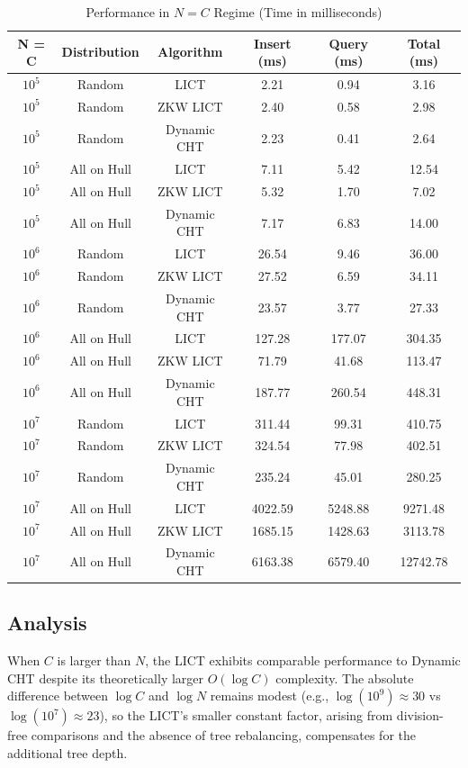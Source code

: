 \documentclass[11pt,a4paper]{article}
\theoremstyle{definition}
\theoremstyle{plain}
\begin{document}
\begin{table}[h]
\centering
\caption{Performance in $N = C$ Regime (Time in milliseconds)}
\label{tab:nc-regime}
\begin{tabular}{@{}cccccc@{}}
\toprule
\textbf{N = C} & \textbf{Distribution} & \textbf{Algorithm} & \textbf{Insert (ms)} & \textbf{Query (ms)} & \textbf{Total (ms)} \\
\midrule
$10^5$ & Random & LICT & 2.21 & 0.94 & 3.16 \\
$10^5$ & Random & ZKW LICT & 2.40 & 0.58 & 2.98 \\
$10^5$ & Random & Dynamic CHT & 2.23 & 0.41 & 2.64 \\
$10^5$ & All on Hull & LICT & 7.11 & 5.42 & 12.54 \\
$10^5$ & All on Hull & ZKW LICT & 5.32 & 1.70 & 7.02 \\
$10^5$ & All on Hull & Dynamic CHT & 7.17 & 6.83 & 14.00 \\
\midrule
$10^6$ & Random & LICT & 26.54 & 9.46 & 36.00 \\
$10^6$ & Random & ZKW LICT & 27.52 & 6.59 & 34.11 \\
$10^6$ & Random & Dynamic CHT & 23.57 & 3.77 & 27.33 \\
$10^6$ & All on Hull & LICT & 127.28 & 177.07 & 304.35 \\
$10^6$ & All on Hull & ZKW LICT & 71.79 & 41.68 & 113.47 \\
$10^6$ & All on Hull & Dynamic CHT & 187.77 & 260.54 & 448.31 \\
\midrule
$10^7$ & Random & LICT & 311.44 & 99.31 & 410.75 \\
$10^7$ & Random & ZKW LICT & 324.54 & 77.98 & 402.51 \\
$10^7$ & Random & Dynamic CHT & 235.24 & 45.01 & 280.25 \\
$10^7$ & All on Hull & LICT & 4022.59 & 5248.88 & 9271.48 \\
$10^7$ & All on Hull & ZKW LICT & 1685.15 & 1428.63 & 3113.78 \\
$10^7$ & All on Hull & Dynamic CHT & 6163.38 & 6579.40 & 12742.78 \\
\bottomrule
\end{tabular}
\end{table}

\subsection{Analysis}

When $C$ is larger than $N$, the LICT exhibits comparable performance to Dynamic CHT despite its theoretically larger $O(\log C)$ complexity. The absolute difference between $\log C$ and $\log N$ remains modest (e.g., $\log(10^9) \approx 30$ vs $\log(10^7) \approx 23$), so the LICT's smaller constant factor, arising from division-free comparisons and the absence of tree rebalancing, compensates for the additional tree depth.
\end{document}
